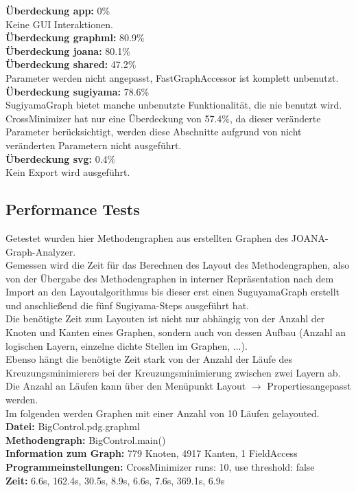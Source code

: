 \textbf{Überdeckung app: }0\%\\
Keine GUI Interaktionen.\\
\textbf{Überdeckung graphml: }80.9\%\\
\textbf{Überdeckung joana: }80.1\%\\
\textbf{Überdeckung shared: }47.2\%\\
Parameter werden nicht angepasst, FastGraphAccessor ist komplett unbenutzt.\\
\textbf{Überdeckung sugiyama: }78.6\%\\
SugiyamaGraph bietet manche unbenutzte Funktionalität, die nie benutzt wird.\\
CrossMinimizer hat nur eine Überdeckung von 57.4\%, da dieser veränderte Parameter berücksichtigt, werden diese Abschnitte aufgrund von nicht veränderten Parametern nicht ausgeführt.\\
\textbf{Überdeckung svg: }0.4\%\\
Kein Export wird ausgeführt.\\

\subsection{Performance Tests}
Getestet wurden hier Methodengraphen aus erstellten Graphen des JOANA-Graph-Analyzer.\\
Gemessen wird die Zeit für das Berechnen des Layout des Methodengraphen, also von der Übergabe des Methodengraphen in interner Repräsentation nach dem Import an den Layoutalgorithmus bis dieser erst einen SuguyamaGraph erstellt und anschließend die fünf Sugiyama-Steps ausgeführt hat.\\
Die benötigte Zeit zum Layouten ist nicht nur abhängig von der Anzahl der Knoten und Kanten eines Graphen, sondern auch von dessen Aufbau (Anzahl an logischen Layern, einzelne dichte Stellen im Graphen, ...).\\
Ebenso hängt die benötigte Zeit stark von der Anzahl der Läufe des Kreuzungsminimierers bei der Kreuzungsminimierung zwischen zwei Layern ab. Die Anzahl an Läufen kann über den Menüpunkt \glqq{}Layout $\to$ Properties\grqq angepasst werden.\\
Im folgenden werden Graphen mit einer Anzahl von 10 Läufen gelayouted.\\

\textbf{Datei: }BigControl.pdg.graphml\\
\textbf{Methodengraph: }BigControl.main()\\
\textbf{Information zum Graph: }779 Knoten, 4917 Kanten, 1 FieldAccess\\
\textbf{Programmeinstellungen: }CrossMinimizer runs: 10, use threshold: false\\
\textbf{Zeit: }6.6s, 162.4s, 30.5s, 8.9s, 6.6s, 7.6s, 369.1s, 6.9s \\

